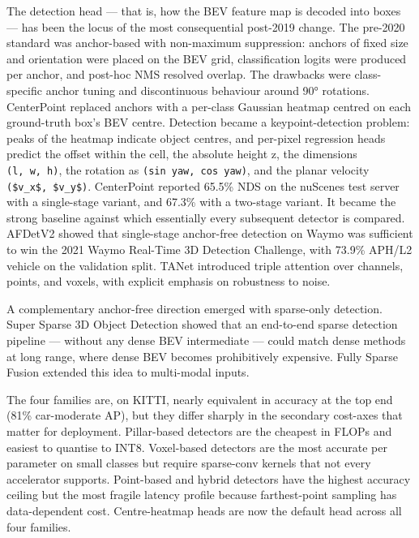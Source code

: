 \documentclass{article}
\begin{document}
The detection head --- that is, how the BEV feature map is decoded into boxes --- has been the locus of the most consequential post-2019 change. The pre-2020 standard was anchor-based with non-maximum suppression: anchors of fixed size and orientation were placed on the BEV grid, classification logits were produced per anchor, and post-hoc NMS resolved overlap. The drawbacks were class-specific anchor tuning and discontinuous behaviour around 90° rotations. CenterPoint \citep{yin2021multimodalvirtualp} replaced anchors with a per-class Gaussian heatmap centred on each ground-truth box's BEV centre. Detection became a keypoint-detection problem: peaks of the heatmap indicate object centres, and per-pixel regression heads predict the offset within the cell, the absolute height z, the dimensions \texttt{(l,\ w,\ h)}, the rotation as \texttt{(sin\ yaw,\ cos\ yaw)}, and the planar velocity \texttt{(\$v\_x\$,\ \$v\_y\$)}. CenterPoint reported 65.5\% NDS on the nuScenes test server with a single-stage variant, and 67.3\% with a two-stage variant. It became the strong baseline against which essentially every subsequent detector is compared. AFDetV2 \citep{hu2022afdetv2rethinkingt} showed that single-stage anchor-free detection on Waymo was sufficient to win the 2021 Waymo Real-Time 3D Detection Challenge, with 73.9\% APH/L2 vehicle on the validation split. TANet \citep{liu2020tanetrobust3dobjec} introduced triple attention over channels, points, and voxels, with explicit emphasis on robustness to noise.

A complementary anchor-free direction emerged with sparse-only detection. Super Sparse 3D Object Detection \citep{fan2023supersparse3dobjec} showed that an end-to-end sparse detection pipeline --- without any dense BEV intermediate --- could match dense methods at long range, where dense BEV becomes prohibitively expensive. Fully Sparse Fusion \citep{li2023bevdepthacquisitio} extended this idea to multi-modal inputs.

The four families are, on KITTI, nearly equivalent in accuracy at the top end (81\% car-moderate AP), but they differ sharply in the secondary cost-axes that matter for deployment. Pillar-based detectors are the cheapest in FLOPs and easiest to quantise to INT8. Voxel-based detectors are the most accurate per parameter on small classes but require sparse-conv kernels that not every accelerator supports. Point-based and hybrid detectors have the highest accuracy ceiling but the most fragile latency profile because farthest-point sampling has data-dependent cost. Centre-heatmap heads are now the default head across all four families.
\end{document}

